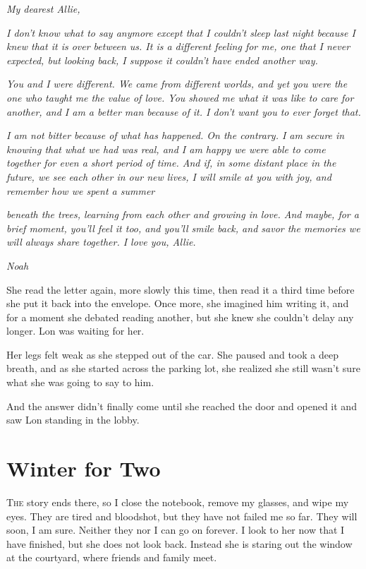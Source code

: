 \documentclass[10pt, twoside, openright]{book}
\newcommand{\chapterornament}[1]{\def\currentornament{#1}}
\def\currentornament{}
\begin{document}
\emph{My dearest Allie,}

\emph{I don't know what to say anymore except that I couldn't sleep last
night because I knew that it is over between us. It is a different
feeling for me, one that I never expected, but looking back, I suppose
it couldn't have ended another way.}

\emph{You and I were different. We came from different worlds, and yet
you were the one who taught me the value of love. You showed me what it
was like to care for another, and I am a better man because of it. I
don't want you to ever forget that.}

\emph{I am not bitter because of what has happened. On the contrary. I
am secure in knowing that what we had was real, and I am happy we were
able to come together for even a short period of time. And if, in some
distant place in the future, we see each other in our new lives, I will
smile at you with joy, and remember how we spent a summer}

\emph{beneath the trees, learning from each other and growing in love.
And maybe, for a brief moment, you'll feel it too, and you'll smile
back, and savor the memories we will always share together. I love you,
Allie.}

\emph{Noah}


She read the letter again, more slowly this time, then read it a third
time before she put it back into the envelope. Once more, she imagined
him writing it, and for a moment she debated reading another, but she
knew she couldn't delay any longer. Lon was waiting for her.

Her legs felt weak as she stepped out of the car. She paused and took a
deep breath, and as she started across the parking lot, she realized she
still wasn't sure what she was going to say to him.

And the answer didn't finally come until she reached the door and opened
it and saw Lon standing in the lobby.

		\newpage
\thispagestyle{empty}
\clearpage
\null
\chapterornament{89}
\chapter{Winter for Two}

\lettrine[findent=0.5em, nindent=0.0em]{T}{he} story ends there, so I close the notebook, remove my glasses, and
wipe my eyes. They are tired and bloodshot, but they have not failed me
so far. They will soon, I am sure. Neither they nor I can go on forever.
I look to her now that I have finished, but she does not look back.
Instead she is staring out the window at the courtyard, where friends
and family meet.
\end{document}
